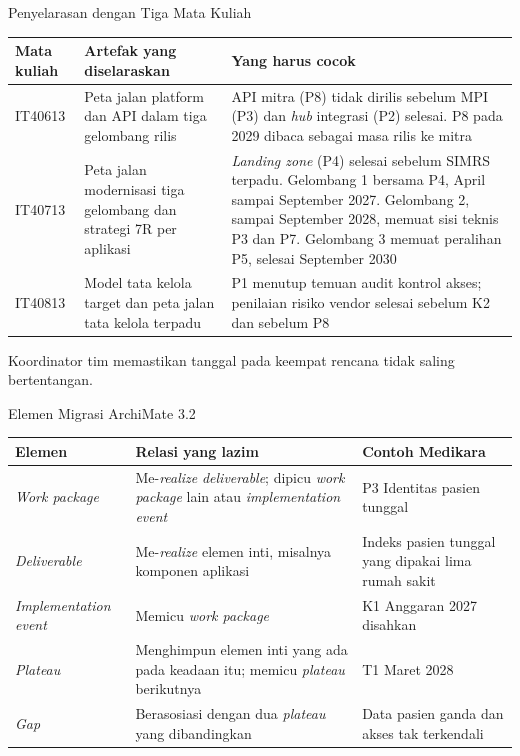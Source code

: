 \documentclass[aspectratio=169, table, 12pt]{beamer}
\begin{document}
\begin{frame}{{\Large Penyelarasan dengan Tiga Mata Kuliah}}
  \scriptsize
  \begin{tabularx}{\textwidth}{L{1.4cm}YY}
    \hline
    \textbf{Mata kuliah} & \textbf{Artefak yang diselaraskan} & \textbf{Yang harus cocok} \\
    \hline
    IT40613 & Peta jalan platform dan API dalam tiga gelombang rilis & API
      mitra (P8) tidak dirilis sebelum MPI (P3) dan \textit{hub} integrasi (P2)
      selesai. P8 pada 2029 dibaca sebagai masa rilis ke mitra \\
    \hline
    IT40713 & Peta jalan modernisasi tiga gelombang dan strategi 7R per
      aplikasi & \textit{Landing zone} (P4) selesai sebelum SIMRS terpadu.
      Gelombang 1 bersama P4, April sampai September 2027. Gelombang 2, sampai
      September 2028, memuat sisi teknis P3 dan P7. Gelombang 3 memuat peralihan
      P5, selesai September 2030 \\
    \hline
    IT40813 & Model tata kelola target dan peta jalan tata kelola terpadu &
      P1 menutup temuan audit kontrol akses; penilaian risiko vendor selesai
      sebelum K2 dan sebelum P8 \\
    \hline
  \end{tabularx}

  \vspace{6pt}
  \small Koordinator tim memastikan tanggal pada keempat rencana tidak saling bertentangan.
\end{frame}

\begin{frame}{{\Large Elemen Migrasi ArchiMate 3.2}}
  \scriptsize
  \begin{tabularx}{\textwidth}{L{2.5cm}YY}
    \hline
    \textbf{Elemen} & \textbf{Relasi yang lazim} & \textbf{Contoh Medikara} \\
    \hline
    \textit{Work package} & Me-\textit{realize} \textit{deliverable}; dipicu
      \textit{work package} lain atau \textit{implementation event} & P3
      Identitas pasien tunggal \\
    \hline
    \textit{Deliverable} & Me-\textit{realize} elemen inti, misalnya komponen
      aplikasi & Indeks pasien tunggal yang dipakai lima rumah sakit \\
    \hline
    \textit{Implementation event} & Memicu \textit{work package} & K1 Anggaran
      2027 disahkan \\
    \hline
    \textit{Plateau} & Menghimpun elemen inti yang ada pada keadaan itu; memicu
      \textit{plateau} berikutnya & T1 Maret 2028 \\
    \hline
    \textit{Gap} & Berasosiasi dengan dua \textit{plateau} yang dibandingkan &
      Data pasien ganda dan akses tak terkendali \\
    \hline
  \end{tabularx}
\end{frame}
\end{document}
